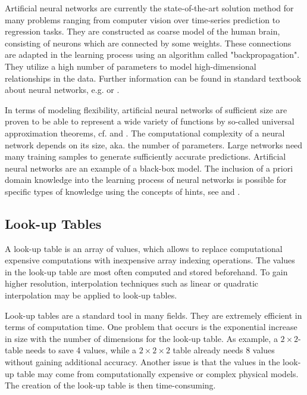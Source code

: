 Artificial neural networks are currently the state-of-the-art solution method for many problems ranging from computer vision over time-series prediction to regression tasks. They are constructed as coarse model of the human brain, consisting of neurons which are connected by some weights. These connections are adapted in the learning process using an algorithm called "backpropagation". They utilize a high number of parameters to model high-dimensional relationships in the data. Further information can be found in standard textbook about neural networks, e.g. \cite{bishop2006patternRecognition} or \cite{goodfellow2016deep}. 

In terms of modeling flexibility, artificial neural networks of sufficient size are proven to be able to represent a wide variety of functions by so-called universal approximation theorems, cf. \cite{cybenko1989approximation} and \cite{hornik1991approximation}. The computational complexity of a neural network depends on its size, aka. the number of parameters. Large networks need many training samples to generate sufficiently accurate predictions. Artificial neural networks are an example of a black-box model. The inclusion of a priori domain knowledge into the learning process of neural networks is possible for specific types of knowledge using the concepts of hints, see \cite{abu1990learning} and \cite{sill1997monotonicity}.

\subsection{Look-up Tables}

A look-up table is an array of values, which allows to replace computational expensive computations with inexpensive array indexing operations. The values in the look-up table are most often computed and stored beforehand. To gain higher resolution, interpolation techniques such as linear or quadratic interpolation may be applied to look-up tables. 

Look-up tables are a standard tool in many fields. They are extremely efficient in terms of computation time. One problem that occurs is the exponential increase in size with the number of dimensions for the look-up table. As example, a $2 \times 2$-table needs to save 4 values, while a $2 \times 2 \times 2$ table already needs 8 values without gaining additional accuracy. Another issue is that the values in the look-up table may come from computationally expensive or complex physical models. The creation of the look-up table is then time-consuming.  

